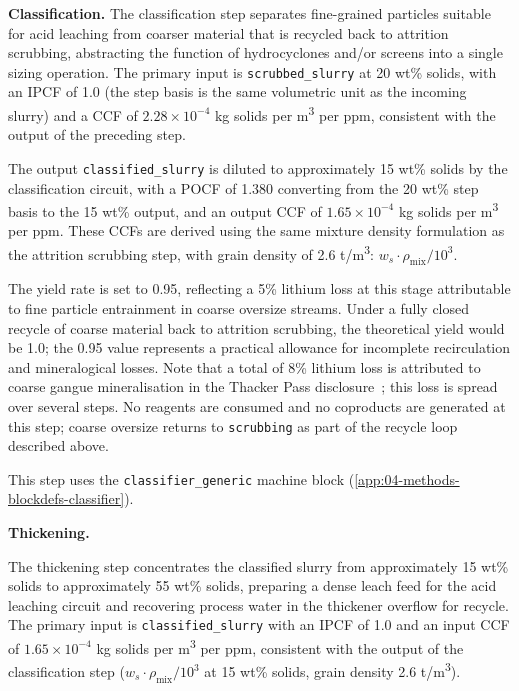 \medskip
\noindent\textbf{Classification.}\quad
The classification step separates fine-grained particles suitable for acid leaching from coarser material that is recycled back to attrition scrubbing, abstracting the function of hydrocyclones and/or screens into a single sizing operation. The primary input is \texttt{scrubbed\_slurry} at 20 wt\% solids, with an IPCF of 1.0 (the step basis is the same volumetric unit as the incoming slurry) and a CCF of $2.28 \times 10^{-4}$ kg solids per m\textsuperscript{3} per ppm, consistent with the output of the preceding step.

The output \texttt{classified\_slurry} is diluted to approximately 15 wt\% solids by the classification circuit, with a POCF of 1.380 converting from the 20 wt\% step basis to the 15 wt\% output, and an output CCF of $1.65 \times 10^{-4}$ kg solids per m\textsuperscript{3} per ppm. These CCFs are derived using the same mixture density formulation as the attrition scrubbing step, with grain density of 2.6 t/m\textsuperscript{3}: $w_s \cdot \rho_{\text{mix}} / 10^3$.

The yield rate is set to 0.95, reflecting a 5\% lithium loss at this stage attributable to fine particle entrainment in coarse oversize streams. Under a fully closed recycle of coarse material back to attrition scrubbing, the theoretical yield would be 1.0; the 0.95 value represents a practical allowance for incomplete recirculation and mineralogical losses. Note that a total of 8\% lithium loss is attributed to coarse gangue mineralisation in the Thacker Pass disclosure~\cite{sgscanadaincSK1300Technical2024}; this loss is spread over several steps. No reagents are consumed and no coproducts are generated at this step; coarse oversize returns to \texttt{scrubbing} as part of the recycle loop described above.

This step uses the \texttt{classifier\_generic} machine block (\ref{app:04-methods-blockdefs-classifier}).

\medskip
\noindent\textbf{Thickening.}\quad

The thickening step concentrates the classified slurry from approximately 15 wt\% solids to approximately 55 wt\% solids, preparing a dense leach feed for the acid leaching circuit and recovering process water in the thickener overflow for recycle. The primary input is \texttt{classified\_slurry} with an IPCF of 1.0 and an input CCF of $1.65 \times 10^{-4}$ kg solids per m\textsuperscript{3} per ppm, consistent with the output of the classification step ($w_s \cdot \rho_{\text{mix}} / 10^3$ at 15 wt\% solids, grain density 2.6 t/m\textsuperscript{3}).

